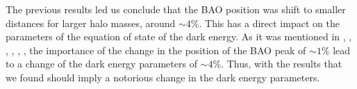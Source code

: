 The previous results led us conclude that the BAO position was shift to smaller distances
for larger halo masses, around $\sim 4\%$. This has a direct impact on the parameters of the 
equation of state of the dark energy. As it was mentioned in \cite{motion}, \cite{uno}, \cite{dos}, \cite{tres}, \cite{cuatro}, \cite{crocce}, the importance of the change in the position of the 
BAO peak of $\sim 1\%$ lead to a change of the dark energy parameters of $\sim 4\%$. Thus, with 
the results that we found should imply a notorious change in the dark energy parameters. 



